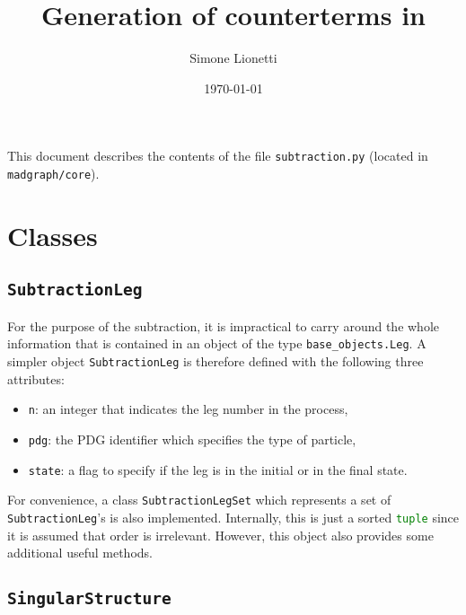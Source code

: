 \documentclass[11pt,a4paper]{article}
\title{Generation of counterterms in \MadNkLO}
\author{Simone Lionetti}
\date{\today}
\newcommand{\py}[1]{\lstinline[language=python]{#1}}
\begin{document}
\maketitle

This document describes the contents of the file \texttt{subtraction.py}
(located in \texttt{madgraph/core}).


\section{Classes}


\subsection{\py{SubtractionLeg}}
\label{ssec:subtractionleg}

For the purpose of the subtraction,
it is impractical to carry around the whole information
that is contained in an object of the type \py{base_objects.Leg}.
A simpler object \py{SubtractionLeg} is therefore defined
with the following three attributes:
\begin{itemize}
	\item \py{n}: an integer that indicates the leg number in the process,
	\item \py{pdg}: the PDG identifier which specifies the type of particle,
	\item \py{state}: a flag to specify if the leg
		is in the initial or in the final state.
\end{itemize}

For convenience, a class \py{SubtractionLegSet} which represents
a set of \py{SubtractionLeg}'s is also implemented.
Internally, this is just a sorted \py{tuple} since it is assumed
that order is irrelevant.
However, this object also provides some additional useful methods.


\subsection{\py{SingularStructure}}
\label{ssec:singularstructure}
\end{document}
